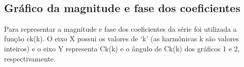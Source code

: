 \documentclass{article}
\begin{document}
    \begin{center}
    \end{center}
    { \hspace*{\fill} \\}
    
    \hypertarget{gruxe1fico-da-magnitude-e-fase-dos-coeficientes}{%
\subsection{Gráfico da magnitude e fase dos
coeficientes}\label{gruxe1fico-da-magnitude-e-fase-dos-coeficientes}}

Para representar a magnitude e fase dos coeficientes da série foi
utilizada a função ck(k). O eixo X possui os valores de `k' (as
harmônicas k são valores inteiros) e o eixo Y representa
\textbar Ck(k)\textbar{} e o ângulo de Ck(k) dos gráficos 1 e 2,
respectivamente.
\end{document}
